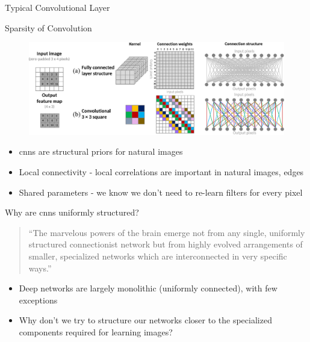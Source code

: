 \documentclass[t,xcolor=dvipsnames]{beamer}
\begin{document}
\begin{frame}{Typical Convolutional Layer}
\begin{figure}
{
    }
\end{figure}
\end{frame}

\begin{frame}{Sparsity of Convolution}
\begin{figure}
    \includegraphics[width=\textwidth]{../Figs/PDF/sparseconn4}
\end{figure}
    \begin{itemize}
        \item \Glspl{cnn} are structural priors for natural images
        \item Local connectivity - local correlations are important in natural images, \eg edges
        \item Shared parameters - we know we don't need to re-learn filters for every pixel
    \end{itemize}
\end{frame}
\begin{frame}{Why are \glspl{cnn} uniformly structured?}
\begin{quote}
``The marvelous powers of the brain emerge not from any single, uniformly structured
connectionist network but from highly evolved arrangements of smaller, specialized
networks which are interconnected in very specific ways.''\\
\end{quote}
\begin{itemize}
    \item Deep networks are largely monolithic (uniformly connected), with few exceptions
    \item Why don't we try to structure our networks closer to the specialized components required for learning images?
\end{itemize}
\end{frame}
\end{document}
